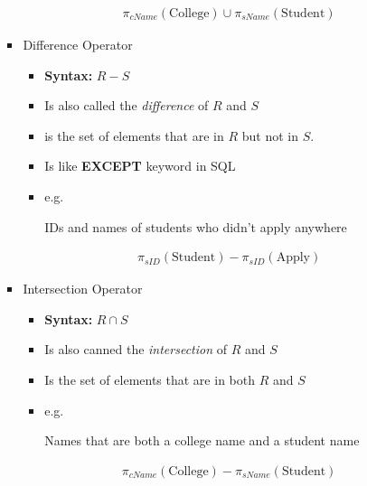\documentclass[12pt]{article}
\begin{document}
\begin{enumerate}
\begin{enumerate}[a)]
\begin{itemize}
\begin{itemize}
                \begin{align*}
                    \pi_{cName}(\text{College}) \cup \pi_{sName} (\text{Student})
                \end{align*}
            \end{itemize}


            \item Difference Operator
            \begin{itemize}
                \item \textbf{Syntax:} $R - S$
                \item Is also called the \textit{difference} of $R$ and $S$
                \item is the set of elements that are in $R$ but not in $S$.
                \item Is like \textbf{EXCEPT} keyword in SQL
                \item e.g.

                \bigskip

                IDs and names of students who didn't apply anywhere

                \begin{align*}
                    \pi_{sID} (\text{Student}) - \pi_{sID}(\text{Apply})
                \end{align*}
            \end{itemize}

            \item Intersection Operator
            \begin{itemize}
                \item \textbf{Syntax:} $R \cap S$
                \item Is also canned the \textit{intersection} of $R$ and $S$
                \item Is the set of elements that are in both $R$ and $S$
                \item e.g.

                \bigskip

                Names that are both a college name and a student name

                \bigskip

                \begin{align*}
                    \pi_{cName} (\text{College}) - \pi_{sName}(\text{Student})
                \end{align*}
            \end{itemize}
        \end{itemize}


\end{enumerate}
\end{enumerate}
\end{document}
